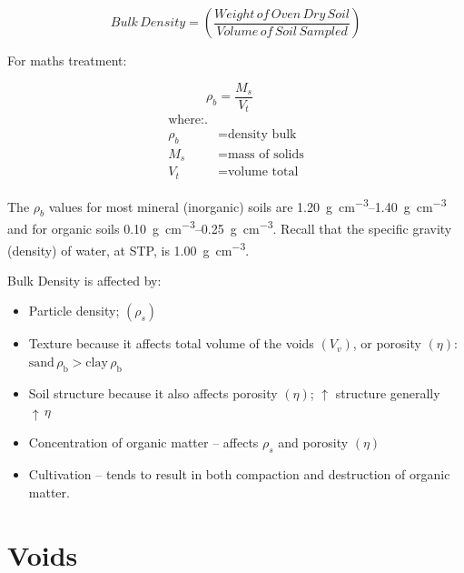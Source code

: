 \documentclass[letterpaper, 12pt]{article}
\begin{document}
\begin{equation}
    Bulk\,Density = \left(\frac{Weight\,of\,Oven\,Dry\,Soil}{Volume\,of\,Soil\,Sampled}\right)
\end{equation}

\noindent\begin{minipage}{\textwidth}
For maths treatment:

\begin{equation}
    \rho_b = \frac{M_s}{V_t}\quad
\end{equation}
\begin{equation*}
    \begin{aligned}
    \text{where:}.                    \\
        \rho_b &= \text{density bulk} \\
        M_s &= \text{mass of solids}  \\
        V_t &= \text{volume total}
    \end{aligned}
\end{equation*}
\end{minipage}

The $\rho_b$ values for most mineral (inorganic) soils are \qtyrange[range-units=single]{1.20}{1.40}{\gram\per\cubic\cm} and for organic soils \qtyrange[range-units=single]{0.10}{0.25}{\gram\per\cubic\centi\meter}. Recall that the specific gravity (density) of water, at STP, is \qty[per-mode=fraction]{1.00}{\gram\per\cubic\centi\meter}.

Bulk Density is affected by:
\begin{itemize}
    \item Particle density; $\left(\rho_s\right)$
    \item Texture because it affects total volume of the voids $\left(V_v\right)$, or porosity $\left(\eta\right)$:  $\text{sand}\,\rho_{\text{b}} > \text{clay}\,\rho_{\text{b}}$
    \item Soil structure because it also affects porosity $\left(\eta\right)$; $\uparrow$  structure generally $\uparrow\,\eta$
    \item Concentration of organic matter – affects $\rho_s$ and porosity $\left(\eta\right)$
    \item Cultivation – tends to result in both compaction and destruction of organic matter.
\end{itemize}

\section{Voids}
\label{voids}
\end{document}

